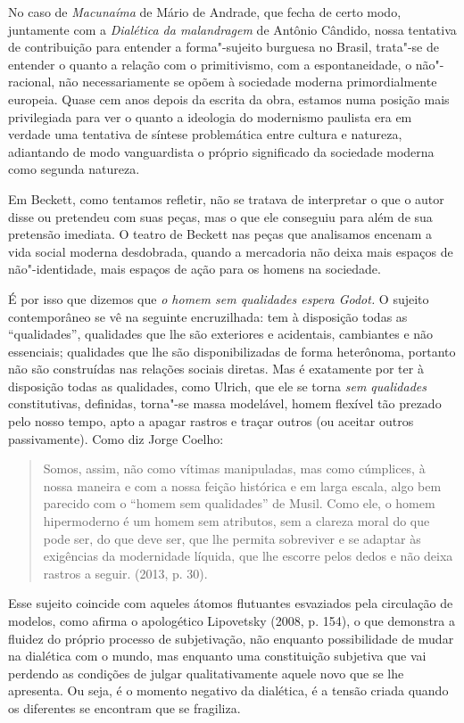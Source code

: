 {No caso de \emph{Macunaíma} de Mário de Andrade, que fecha de certo
modo, juntamente com a \emph{Dialética da malandragem} de Antônio
Cândido, nossa tentativa de contribuição para entender a forma"-sujeito
burguesa no Brasil, trata"-se de entender o quanto a relação com o
primitivismo, com a espontaneidade, o não"-racional, não necessariamente
se opõem à sociedade moderna primordialmente europeia. Quase cem anos
depois da escrita da obra, estamos numa posição mais privilegiada para
ver o quanto a ideologia do modernismo paulista era em verdade uma
tentativa de síntese problemática entre cultura e natureza, adiantando
de modo vanguardista o próprio significado da sociedade moderna como
segunda natureza.

Em Beckett, como tentamos refletir, não se tratava de interpretar o que
o autor disse ou pretendeu com suas peças, mas o que ele conseguiu para
além de sua pretensão imediata. O teatro de Beckett nas peças que
analisamos encenam a vida social moderna desdobrada, quando a mercadoria
não deixa mais espaços de não"-identidade, mais espaços de ação para os
homens na sociedade.

É por isso que dizemos que \emph{o homem sem qualidades espera Godot.} O
sujeito contemporâneo se vê na seguinte encruzilhada: tem à disposição
todas as ``qualidades'', qualidades que lhe são exteriores e acidentais,
cambiantes e não essenciais; qualidades que lhe são disponibilizadas de
forma heterônoma, portanto não são construídas nas relações sociais
diretas. Mas é exatamente por ter à disposição todas as qualidades, como
Ulrich, que ele se torna \emph{sem qualidades} constitutivas, definidas,
torna"-se massa modelável, homem flexível tão prezado pelo nosso tempo,
apto a apagar rastros e traçar outros (ou aceitar outros passivamente).
Como diz Jorge Coelho:

\begin{quote}
Somos, assim, não como vítimas manipuladas, mas como cúmplices, à nossa
maneira e com a nossa feição histórica e em larga escala, algo bem
parecido com o ``homem sem qualidades'' de Musil. Como ele, o homem
hipermoderno é um homem sem atributos, sem a clareza moral do que pode
ser, do que deve ser, que lhe permita sobreviver e se adaptar às
exigências da modernidade líquida, que lhe escorre pelos dedos e não
deixa rastros a seguir. (2013, p. 30).
\end{quote}

Esse sujeito coincide com aqueles átomos flutuantes esvaziados pela
circulação de modelos, como afirma o apologético Lipovetsky (2008, p.
154), o que demonstra a fluidez do próprio processo de subjetivação, não
enquanto possibilidade de mudar na dialética com o mundo, mas enquanto
uma constituição subjetiva que vai perdendo as condições de julgar
qualitativamente aquele novo que se lhe apresenta. Ou seja, é o momento
negativo da dialética, é a tensão criada quando os diferentes se
encontram que se fragiliza.

}
